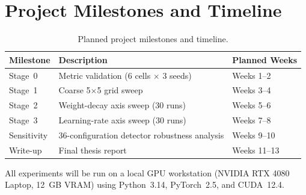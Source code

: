 \documentclass[12pt,openany,a4paper]{book}
\begin{document}
\section{Project Milestones and Timeline}

\begin{table}[htbp]
  \centering
  \caption{Planned project milestones and timeline.}
  \label{tab:milestones}
  \renewcommand{\arraystretch}{1.2}
  \begin{tabular}{lll}
    \toprule
    Milestone & Description & Planned Weeks \\
    \midrule
    Stage~0 & Metric validation (6 cells $\times$ 3 seeds) & Weeks 1--2 \\
    Stage~1 & Coarse 5$\times$5 grid sweep & Weeks 3--4 \\
    Stage~2 & Weight-decay axis sweep (30 runs) & Weeks 5--6 \\
    Stage~3 & Learning-rate axis sweep (30 runs) & Weeks 7--8 \\
    Sensitivity & 36-configuration detector robustness analysis & Weeks 9--10 \\
    Write-up  & Final thesis report & Weeks 11--13 \\
    \bottomrule
  \end{tabular}
\end{table}

All experiments will be run on a local GPU workstation
(NVIDIA RTX 4080 Laptop, 12~GB VRAM) using
Python~3.14, PyTorch~2.5, and CUDA~12.4.
\end{document}
